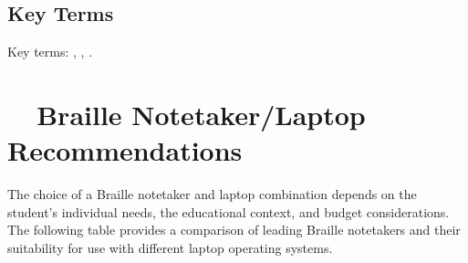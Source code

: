 \subsection{Key Terms}\label{chap3:key-terms}
Key terms: , , .

\section{~~Braille Notetaker/Laptop Recommendations}\label{ch3:sec:notetaker-laptop-recs}
The choice of a Braille notetaker and laptop combination depends on the student's individual needs, the educational context, and budget considerations. The following table provides a comparison of leading Braille notetakers and their suitability for use with different laptop operating systems.

